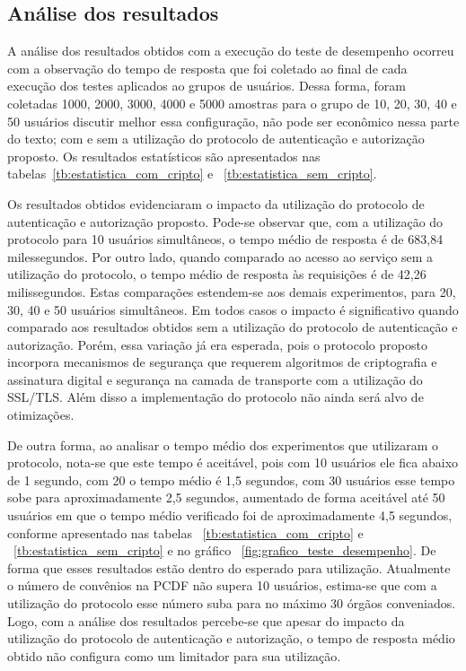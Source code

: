 \subsection{Análise dos resultados}

A análise dos resultados obtidos com a execução do teste de desempenho ocorreu com a observação do tempo de resposta que foi coletado ao final de cada execução dos testes aplicados ao grupos de usuários. Dessa forma, foram coletadas 1000, 2000, 3000, 4000 e 5000 amostras para o grupo de 10, 20, 30, 40 e 50 usuários {\color{red}discutir melhor essa configura\c c\~{a}o, n\~{a}o pode ser econ\^{o}mico nessa parte do texto}; com e sem a utilização do protocolo de autenticação e autorização proposto. Os resultados estatísticos são apresentados nas tabelas~\ref{tb:estatistica_com_cripto} e ~\ref{tb:estatistica_sem_cripto}.

Os resultados obtidos evidenciaram o impacto da utilização do protocolo de autenticação e autorização proposto. Pode-se observar que, com a utilização do protocolo para 10 usuários simultâneos, o tempo médio de resposta é de 683,84 milessegundos. Por outro lado, quando comparado ao acesso ao serviço sem a utilização do protocolo, o tempo m\'{e}dio de
resposta \`{a}s requisi\c c\~{o}es \'{e} de 42,26 milissegundos. Estas comparações estendem-se aos demais experimentos, para 20, 30, 40 e 50 usuários simultâneos. Em todos casos o impacto é significativo quando comparado aos resultados obtidos sem a utilização do protocolo de autenticação e autorização. Porém, essa variação já era esperada, pois o protocolo proposto incorpora mecanismos de segurança que requerem algoritmos de criptografia e assinatura digital e segurança na camada de transporte com a utilização do SSL/TLS. Al\'{e}m disso
 a implementa\c c\~{a}o do protocolo n\~{a}o ainda ser\'{a} alvo de otimiza\c c\~{o}es.

De outra forma, ao analisar o tempo médio dos experimentos que utilizaram o protocolo, nota-se que este tempo é aceitável, pois com 10 usuários ele fica abaixo de 1 segundo, com 20 o tempo médio é 1,5 segundos, com 30 usuários esse tempo sobe para aproximadamente 2,5 segundos, aumentado de forma aceitável até 50 usuários em que o tempo médio verificado foi de aproximadamente 4,5 segundos, conforme apresentado nas tabelas ~\ref{tb:estatistica_com_cripto} e ~\ref{tb:estatistica_sem_cripto} e no gráfico ~\ref{fig:grafico_teste_desempenho}. De forma que esses resultados estão dentro do esperado para utilização. Atualmente o número de convênios na PCDF não supera 10 usuários, estima-se que com a utilização do protocolo esse número suba para no máximo 30 órgãos conveniados. Logo, com a análise dos resultados percebe-se que apesar do impacto da utilização do protocolo de autenticação e autorização, o tempo de resposta médio obtido não configura como um limitador para sua utilização.


